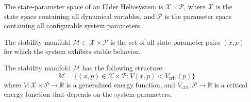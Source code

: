 \begin{definition}
The state-parameter space of an Elder Heliosystem is $\mathcal{X} \times \mathcal{P}$, where $\mathcal{X}$ is the state space containing all dynamical variables, and $\mathcal{P}$ is the parameter space containing all configurable system parameters.
\end{definition}

\begin{definition}
The stability manifold $\mathcal{M} \subset \mathcal{X} \times \mathcal{P}$ is the set of all state-parameter pairs $(x, p)$ for which the system exhibits stable behavior.
\end{definition}

\begin{theorem}
The stability manifold $\mathcal{M}$ has the following structure:
\begin{equation}
\mathcal{M} = \{(x, p) \in \mathcal{X} \times \mathcal{P} : V(x, p) < V_{\text{crit}}(p)\}
\end{equation}
where $V: \mathcal{X} \times \mathcal{P} \rightarrow \mathbb{R}$ is a generalized energy function, and $V_{\text{crit}}: \mathcal{P} \rightarrow \mathbb{R}$ is a critical energy function that depends on the system parameters.
\end{theorem}

